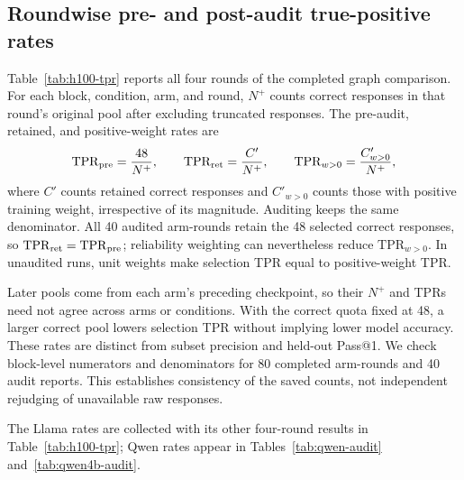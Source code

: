 \subsection{Roundwise pre- and post-audit true-positive rates}
\label{app:roundwise-tpr}
Table~\ref{tab:h100-tpr} reports all four rounds of the completed graph
comparison. For each block, condition, arm, and round, $N^+$ counts correct
responses in that round's original pool after excluding truncated responses.
The pre-audit, retained, and positive-weight rates are
\[
 \mathrm{TPR}_{\rm pre}=\frac{48}{N^+},\qquad
 \mathrm{TPR}_{\rm ret}=\frac{C'}{N^+},\qquad
 \mathrm{TPR}_{w>0}=\frac{C'_{w>0}}{N^+},
\]
where $C'$ counts retained correct responses and $C'_{w>0}$ counts those
with positive training weight, irrespective of its magnitude. Auditing
keeps the same denominator.
All 40 audited arm-rounds retain the 48 selected correct responses, so
$\mathrm{TPR}_{\rm ret}=\mathrm{TPR}_{\rm pre}$; reliability weighting can
nevertheless reduce $\mathrm{TPR}_{w>0}$. In unaudited runs, unit weights
make selection TPR equal to positive-weight TPR.

Later pools come from each arm's preceding checkpoint, so their $N^+$
and TPRs need not agree across arms or conditions. With the correct quota
fixed at 48, a larger correct pool lowers selection TPR without implying
lower model accuracy. These rates are distinct from subset precision and
held-out Pass@1. We check block-level numerators and denominators for
80 completed arm-rounds and 40 audit reports. This establishes consistency
of the saved counts, not independent rejudging of unavailable raw responses.

The Llama rates are collected with its other four-round results in
Table~\ref{tab:h100-tpr}; Qwen rates appear in
Tables~\ref{tab:qwen-audit} and~\ref{tab:qwen4b-audit}.


